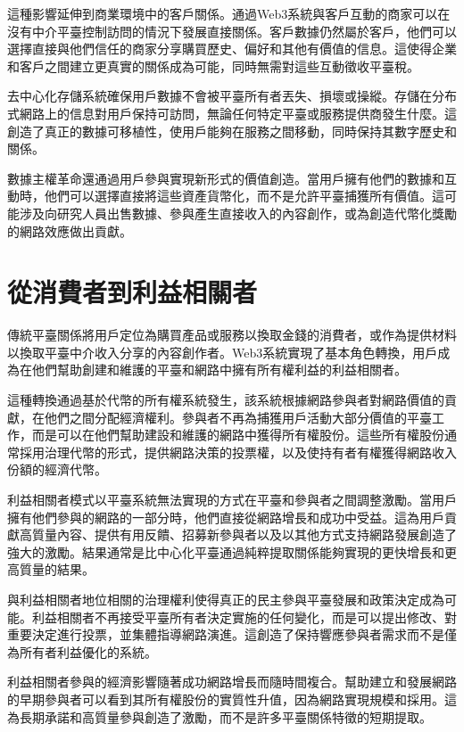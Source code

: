 \documentclass[
  Letterpaper,
]{scrbook}
\begin{document}
這種影響延伸到商業環境中的客戶關係。通過Web3系統與客戶互動的商家可以在沒有中介平臺控制訪問的情況下發展直接關係。客戶數據仍然屬於客戶，他們可以選擇直接與他們信任的商家分享購買歷史、偏好和其他有價值的信息。這使得企業和客戶之間建立更真實的關係成為可能，同時無需對這些互動徵收平臺稅。

去中心化存儲系統確保用戶數據不會被平臺所有者丟失、損壞或操縱。存儲在分布式網路上的信息對用戶保持可訪問，無論任何特定平臺或服務提供商發生什麼。這創造了真正的數據可移植性，使用戶能夠在服務之間移動，同時保持其數字歷史和關係。

數據主權革命還通過用戶參與實現新形式的價值創造。當用戶擁有他們的數據和互動時，他們可以選擇直接將這些資產貨幣化，而不是允許平臺捕獲所有價值。這可能涉及向研究人員出售數據、參與產生直接收入的內容創作，或為創造代幣化獎勵的網路效應做出貢獻。

\section{從消費者到利益相關者}\label{ux5f9eux6d88ux8cbbux8005ux5230ux5229ux76caux76f8ux95dcux8005}

傳統平臺關係將用戶定位為購買產品或服務以換取金錢的消費者，或作為提供材料以換取平臺中介收入分享的內容創作者。Web3系統實現了基本角色轉換，用戶成為在他們幫助創建和維護的平臺和網路中擁有所有權利益的利益相關者。

這種轉換通過基於代幣的所有權系統發生，該系統根據網路參與者對網路價值的貢獻，在他們之間分配經濟權利。參與者不再為捕獲用戶活動大部分價值的平臺工作，而是可以在他們幫助建設和維護的網路中獲得所有權股份。這些所有權股份通常採用治理代幣的形式，提供網路決策的投票權，以及使持有者有權獲得網路收入份額的經濟代幣。

利益相關者模式以平臺系統無法實現的方式在平臺和參與者之間調整激勵。當用戶擁有他們參與的網路的一部分時，他們直接從網路增長和成功中受益。這為用戶貢獻高質量內容、提供有用反饋、招募新參與者以及以其他方式支持網路發展創造了強大的激勵。結果通常是比中心化平臺通過純粹提取關係能夠實現的更快增長和更高質量的結果。

與利益相關者地位相關的治理權利使得真正的民主參與平臺發展和政策決定成為可能。利益相關者不再接受平臺所有者決定實施的任何變化，而是可以提出修改、對重要決定進行投票，並集體指導網路演進。這創造了保持響應參與者需求而不是僅為所有者利益優化的系統。

利益相關者參與的經濟影響隨著成功網路增長而隨時間複合。幫助建立和發展網路的早期參與者可以看到其所有權股份的實質性升值，因為網路實現規模和採用。這為長期承諾和高質量參與創造了激勵，而不是許多平臺關係特徵的短期提取。
\end{document}
